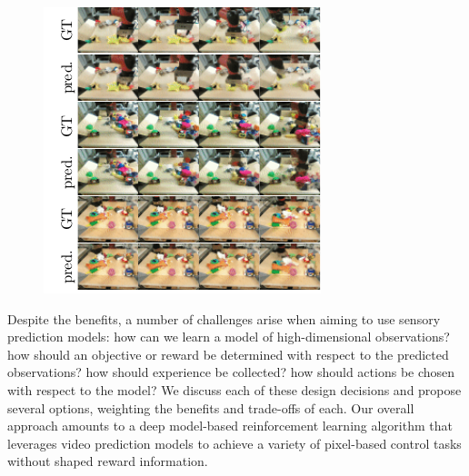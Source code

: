 
\begin{figure}[t]
\centering
\includegraphics[width=.8\columnwidth,trim={3.2mm 0 0 0},clip]{images_rfr/video_prediction.pdf}
\caption{\small{}}
\label{fig:video_prediction}
\end{figure}

Despite the benefits, a number of challenges arise when aiming to use sensory prediction models: how can we learn a model of high-dimensional observations? how should an objective or reward be determined with respect to the predicted observations? how should experience be collected? how should actions be chosen with respect to the model? We discuss each of these design decisions and propose several options, weighting the benefits and trade-offs of each.
Our overall approach amounts to a deep model-based reinforcement learning algorithm that leverages video prediction models to achieve a variety of pixel-based control tasks without shaped reward information.

